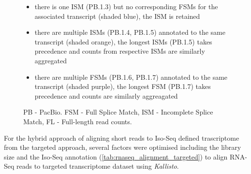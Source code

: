 \begin{figure}[htp]
{\begin{itemize}
			\item there is one ISM (PB.1.3) but no corresponding FSMs for the associated transcript (shaded blue), the ISM is retained
			\item there are multiple ISMs (PB.1.4, PB.1.5) annotated to the same transcript (shaded orange), the longest ISMs (PB.1.5) takes precedence and counts from respective ISMs are similarly aggregated 
			\item there are multiple FSMs (PB.1.6, PB.1.7) annotated to the same transcript (shaded purple), the longest FSM (PB.1.7) takes precedence and counts are similarly aggreagated
			\\
		\end{itemize} 
		PB - PacBio. FSM - Full Splice Match, ISM - Incomplete Splice Match, FL - Full-length read counts.  
	}
	\label{fig:ism_collapse}
\end{figure}

\clearpage
{}
For the hybrid approach of aligning short reads to Iso-Seq defined trascriptome from the targeted approach, several factors were optimised including the library size and the Iso-Seq annotation (\cref{tab:rnaseq_alignment_targeted}) to align RNA-Seq reads to targeted transcriptome dataset using \textit{Kallisto}. 

